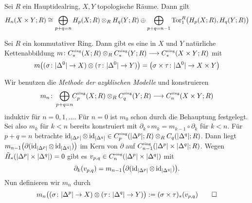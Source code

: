 \begin{korollarB}[{name=[{Künneth-Formel für die Homologie eines Produktraums}]}]
	Sei $R$ ein Hauptidealring, $X,Y$ topologische Räume.
	Dann gilt
	\[
		H_n(X \times Y;R) \cong \bigoplus_{p+q=n} H_p(X;R) \otimes_R H_q(Y;R) \oplus \bigoplus_{p+q=n-1} \Tor_1^R \enbrace[\big]{H_p(X;R),H_q(Y;R)}
	\]
\end{korollarB}

\begin{proposition}[{name={Existenz}}]
	Sei $R$ ein kommutativer Ring.
	Dann gibt es eine in $X$ und $Y$ natürliche Kettenabbildung 
	\(
		m \colon C^\sing_*(X;R) \otimes_R C^\sing_*(Y;R) \longrightarrow C^\sing_*(X \times Y;R)
	\)
	mit 
	\[
		m \enbrace*{ \enbrace{\sigma \colon \abs{\Delta^0} \to X } \otimes \enbrace{\tau \colon \abs{\Delta^0} \to Y}}= \enbrace[\big]{\sigma \times \tau \colon \abs{\Delta^0} \to X \times Y}
	\]
\end{proposition}
\begin{beweis}
	Wir benutzen die \emph{Methode der azyklischen Modelle} und konstruieren 
	\[
		m_n \colon \bigoplus_{p+q=n}\!\! C^\sing_p(X;R) \otimes_R C^\sing_q(Y;R) \longrightarrow C^\sing_n(X \times Y;R) 
	\]
	induktiv für $n=0,1,\ldots $.
	Für $n=0$ ist $m_0$ schon durch die Behauptung festgelegt.
	Sei also $m_k$ für $k<n$ bereits konstruiert mit $\partial_k \circ m_k = m_{k-1} \circ \partial_k$ für $k<n$.
	Für $p+q=n$ betrachte $\id_{\abs*{\Delta^p}} \otimes \id_{\abs*{\Delta^q}} \in C^\sing_p(\abs*{\Delta^p};R) \otimes_R C_q \enbrace*{\abs*{\Delta^q};R}$.
	Dann liegt $m_{n-1} \enbrace*{\partial \enbrace{\id_{\abs*{\Delta^p}} \otimes \id_{\abs*{\Delta^q}}}}$ im Kern von $\partial$ auf $C^\sing_{n-1} \enbrace*{\abs*{\Delta^p} \times \abs*{\Delta^q};R}$.
	Wegen $\tilde{H}_*(\abs*{\Delta^p} \times \abs*{\Delta^q})=0$ gibt es $v_{p,q} \in C^\sing_n \enbrace*{\abs*{\Delta^p} \times \abs*{\Delta^q}}$ mit 
	\[
		\partial_k(v_{p,q}) = m_{n-1} \enbrace*{\partial \enbrace{\id_{\abs*{\Delta^p} } \otimes \id_{\abs*{\Delta^q}}}}. 
	\]
	Nun definieren wir $m_n$ durch 
	\[
		m_n \enbrace[\big]{ \enbrace{\sigma \colon \abs{\Delta^p} \to X } \otimes \enbrace{\tau \colon \abs{\Delta^q} \to Y}} := (\sigma\times \tau)_* \enbrace*{v_{p,q}} \qedhere
	\]
\end{beweis}

